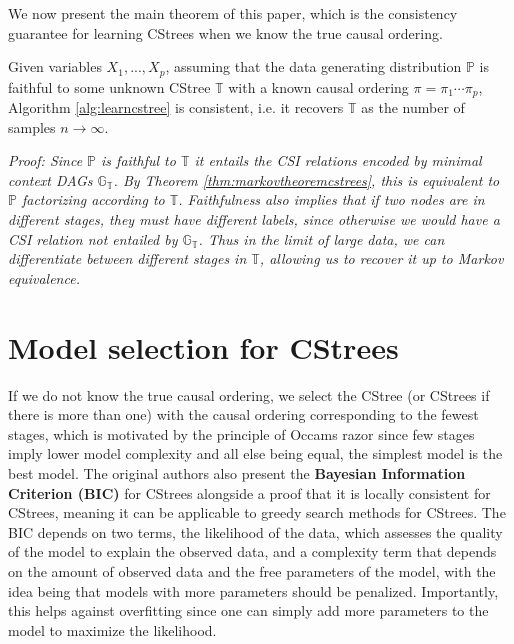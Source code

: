 \documentclass{tufte-book}
\begin{document}
We now present the main theorem of this paper, which is the consistency guarantee for learning CStrees when we know the true causal ordering.


\begin{theorem}\label{thm:cstreepccorrectness}
Given variables $X_1,...,X_p$, assuming that the data generating distribution $\mathbb{P}$ is faithful to some unknown CStree $\mathbb{T}$ with a known causal ordering $\pi = \pi_1 \cdots \pi_p$, Algorithm \ref{alg:learncstree} is consistent, i.e. it recovers $\mathbb{T}$ as the number of samples $n \rightarrow \infty$.
\end{theorem}


\textit{Proof:
Since $\mathbb{P}$ is faithful to $\mathbb{T}$ it entails the CSI relations encoded by minimal context DAGs $\mathbb{G}_{\mathbb{T}}$. By Theorem \ref{thm:markovtheoremcstrees}, this is equivalent to $\mathbb{P}$ factorizing according to $\mathbb{T}$. Faithfulness also implies that if two nodes are in different stages, they must have different labels, since otherwise we would have a CSI relation not entailed by $\mathbb{G}_{\mathbb{T}}$. Thus in the limit of large data, we can differentiate between different stages in $\mathbb{T}$, allowing us to recover it up to Markov equivalence.
}

\section{Model selection for CStrees}
\label{sec:org3467df8}
If we do not know the true causal ordering, we select the CStree (or CStrees if there is more than one) with the causal ordering corresponding to the fewest stages, which is motivated by the principle of Occams razor \cite{pearl-2009-causal} since few stages imply lower model complexity and all else being equal, the simplest model is the best model. The original authors also present the \textbf{Bayesian Information Criterion (BIC)} for CStrees alongside a proof that it is locally consistent for CStrees, meaning it can be applicable to greedy search methods for CStrees. The BIC depends on two terms, the likelihood of the data, which assesses the quality of the model to explain the observed data, and a complexity term that depends on the amount of observed data and the free parameters of the model, with the idea being that models with more parameters should be penalized. Importantly, this helps against overfitting since one can simply add more parameters to the model to maximize the likelihood.
\end{document}
